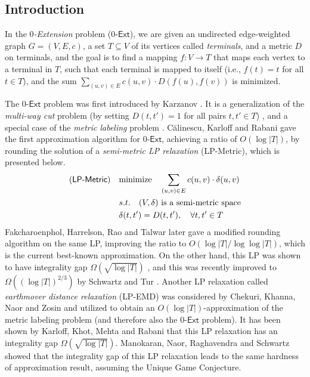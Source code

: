 \documentclass[11pt]{article}
\theoremstyle{definition}
\newcommand{\ze}{$0$-$\textsf{Ext}$\xspace}
\begin{document}
\begin{titlepage}
\section{Introduction}

In the \emph{$0$-Extension} problem (\ze), we are given an undirected edge-weighted graph $G=(V,E,c)$, a set $T\subseteq V$ of its vertices called \emph{terminals}, and a metric $D$ on terminals, and the goal is to find a mapping $f: V\to T$ that maps each vertex to a terminal in $T$, such that each terminal is mapped to itself (i.e., $f(t)=t$ for all $t\in T$), and the sum $\sum_{(u,v)\in E}c{(u,v)}\cdot D(f(u),f(v))$ is minimized.

The \ze problem was first introduced by Karzanov \cite{karzanov1998minimum}. It is a generalization of the \emph{multi-way cut} problem (by setting $D(t,t')=1$ for all pairs $t,t'\in T$) \cite{dahlhaus1994complexity,cualinescu1998improved,freund2000lower,buchbinder2013simplex,angelidakis2017improved,buchbinder2017simplex,berczi2020improving}, and a special case of the \emph{metric labeling} problem \cite{kleinberg2002approximation,chekuri2004linear,archer2004approximate,karloff2006earthmover,chuzhoy2007hardness}.
C\u{a}linescu, Karloff and Rabani \cite{calinescu2005approximation} gave the first approximation algorithm for \ze, achieving a ratio of $O(\log |T|)$, by rounding the solution of a \emph{semi-metric LP relaxation} (\textsf{LP-Metric}), which is presented below.
%
\begin{eqnarray*}
	\mbox{(\textsf{LP-Metric})}\quad &  \text{minimize}\quad  \sum_{(u,v)\in E}c(u,v)\cdot \delta(u,v)\\
	& s.t. \quad (V,\delta) \text{ is a semi-metric space}\\
	& \delta(t,t')=D(t,t'), \quad\forall t,t'\in T
\end{eqnarray*}
Fakcharoenphol, Harrelson, Rao and
Talwar \cite{fakcharoenphol2003improved} later gave a modified rounding algorithm on the same LP, improving the ratio to $O(\log |T|/\log\log |T|)$, which is the current best-known approximation. On the other hand, this LP was shown to have integrality gap $\Omega(\sqrt{\log |T|})$ \cite{calinescu2005approximation}, and this was recently improved to $\Omega((\log |T|)^{2/3})$ by Schwartz and Tur \cite{schwartz2021metric}.
Another LP relaxation called \emph{earthmover distance relaxation} (\textsf{LP-EMD}) was considered by Chekuri, Khanna, Naor and Zosin \cite{chekuri2004linear} and utilized to obtain an $O(\log |T|)$-approximation of the metric labeling problem (and therefore also the \ze problem). It has been shown \cite{karloff2009earthmover} by Karloff, Khot, Mehta and Rabani that this LP relaxation has an integrality gap $\Omega(\sqrt{\log |T|})$. Manokaran, Naor, Raghavendra
and Schwartz \cite{manokaran2008sdp} showed that the integrality gap of this LP relaxation leads to the same hardness of approximation result, assuming the Unique Game Conjecture.



\end{titlepage}
\end{document}
